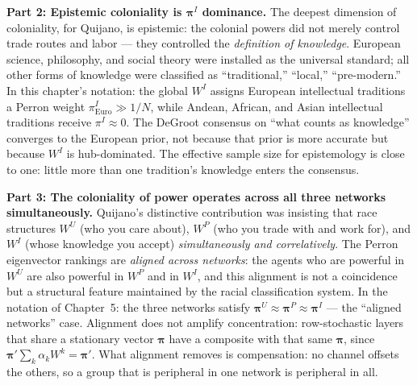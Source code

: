 \documentclass[../structural_economics_book.tex]{subfiles}
\begin{document}
\textbf{Part 2: Epistemic coloniality is $\boldsymbol{\pi}^I$ dominance.} The deepest dimension of coloniality, for Quijano, is epistemic: the colonial powers did not merely control trade routes and labor --- they controlled the \textit{definition of knowledge}. European science, philosophy, and social theory were installed as the universal standard; all other forms of knowledge were classified as ``traditional,'' ``local,'' ``pre-modern.'' In this chapter's notation: the global $W^I$ assigns European intellectual traditions a Perron weight $\pi^I_{\text{Euro}} \gg 1/N$, while Andean, African, and Asian intellectual traditions receive $\pi^I \approx 0$. The DeGroot consensus on ``what counts as knowledge'' converges to the European prior, not because that prior is more accurate but because $W^I$ is hub-dominated. The effective sample size for epistemology is close to one: little more than one tradition's knowledge enters the consensus.

\textbf{Part 3: The coloniality of power operates across all three networks simultaneously.} Quijano's distinctive contribution was insisting that race structures $W^U$ (who you care about), $W^P$ (who you trade with and work for), and $W^I$ (whose knowledge you accept) \textit{simultaneously and correlatively}. The Perron eigenvector rankings are \textit{aligned across networks}: the agents who are powerful in $W^U$ are also powerful in $W^P$ and in $W^I$, and this alignment is not a coincidence but a structural feature maintained by the racial classification system. In the notation of Chapter~5: the three networks satisfy $\boldsymbol{\pi}^U \approx \boldsymbol{\pi}^P \approx \boldsymbol{\pi}^I$ --- the ``aligned networks'' case. Alignment does not amplify concentration: row-stochastic layers that share a stationary vector $\boldsymbol{\pi}$ have a composite with that same $\boldsymbol{\pi}$, since $\boldsymbol{\pi}'\sum_k\alpha_kW^k = \boldsymbol{\pi}'$. What alignment removes is compensation: no channel offsets the others, so a group that is peripheral in one network is peripheral in all.
\end{document}
